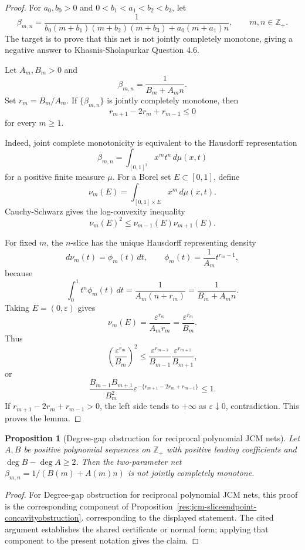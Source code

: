 \documentclass[11pt]{article}
\numberwithin{equation}{section}
\newtheorem{proposition}[theorem]{Proposition}
\theoremstyle{definition}
\theoremstyle{remark}
\newcommand{\1}{\mathbf 1}
\begin{document}
\begin{proof}
For \(a_0,b_0>0\) and \(0<b_1<a_1<b_2<b_3\), let
\[
\beta_{m,n}
=
\frac{1}{b_0(m+b_1)(m+b_2)(m+b_3)+a_0(m+a_1)n},
\qquad m,n\in\mathbb Z_+.
\]
The target is to prove that this net is not jointly completely monotone, giving a negative answer to Khasnis-Sholapurkar Question 4.6.

Let \(A_m,B_m>0\) and
\[
\beta_{m,n}=\frac{1}{B_m+A_m n}.
\]
Set \(r_m=B_m/A_m\). If \(\{\beta_{m,n}\}\) is jointly completely monotone, then
\[
r_{m+1}-2r_m+r_{m-1}\le 0
\]
for every \(m\ge1\).

Indeed, joint complete monotonicity is equivalent to the Hausdorff representation
\[
\beta_{m,n}=\int_{[0,1]^2} x^m t^n\,d\mu(x,t)
\]
for a positive finite measure \(\mu\). For a Borel set \(E\subset[0,1]\), define
\[
\nu_m(E)=\int_{[0,1]\times E}x^m\,d\mu(x,t).
\]
Cauchy-Schwarz gives the log-convexity inequality
\[
\nu_m(E)^2\le \nu_{m-1}(E)\nu_{m+1}(E).
\]

For fixed \(m\), the \(n\)-slice has the unique Hausdorff representing density
\[
d\nu_m(t)=\phi_m(t)\,dt,\qquad
\phi_m(t)=\frac{1}{A_m}t^{r_m-1},
\]
because
\[
\int_0^1 t^n\phi_m(t)\,dt
=
\frac{1}{A_m(n+r_m)}
=
\frac{1}{B_m+A_mn}.
\]
Taking \(E=(0,\varepsilon)\) gives
\[
\nu_m(E)=\frac{\varepsilon^{r_m}}{A_m r_m}
=
\frac{\varepsilon^{r_m}}{B_m}.
\]
Thus
\[
\left(\frac{\varepsilon^{r_m}}{B_m}\right)^2
\le
\frac{\varepsilon^{r_{m-1}}}{B_{m-1}}
\frac{\varepsilon^{r_{m+1}}}{B_{m+1}},
\]
or
\[
\frac{B_{m-1}B_{m+1}}{B_m^2}
\varepsilon^{-\{r_{m+1}-2r_m+r_{m-1}\}}\le1.
\]
If \(r_{m+1}-2r_m+r_{m-1}>0\), the left side tends to \(+\infty\) as \(\varepsilon\downarrow0\), contradiction. This proves the lemma.
\end{proof}

\begin{proposition}[Degree-gap obstruction for reciprocal polynomial JCM nets]
\label{res:polynomialreciprocal-jcm-degreegap-obstruction}
Let \(A,B\) be positive polynomial sequences on \(\mathbb Z_+\) with positive leading coefficients and \(\deg B-\deg A\ge2\). Then the two-parameter net \(\beta_{m,n}=1/(B(m)+A(m)n)\) is not jointly completely monotone.
\end{proposition}

\begin{proof}
For Degree-gap obstruction for reciprocal polynomial JCM nets, this proof is the corresponding component of Proposition~\ref{res:jcm-sliceendpoint-concavityobstruction}.  corresponding to the displayed statement.  The cited argument establishes the shared certificate or normal form; applying that component to the present notation gives the claim.
\end{proof}
\end{document}
